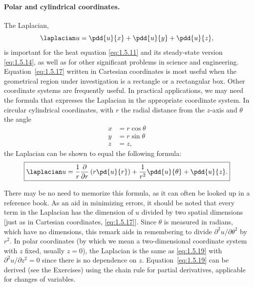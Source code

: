 \paragraph{Polar and cylindrical coordinates.}
The Laplacian,
\begin{equation}
\laplacian u = \pdd{u}{x} + \pdd{u}{y} + \pdd{u}{z},
\label{eq:1.5.17}
\end{equation}
is important for the heat equation \eqref{eq:1.5.11} and its steady-state version \eqref{eq:1.5.14}, as well as for other significant problems in science and engineering. Equation~\eqref{eq:1.5.17} written in Cartesian coordinates is most useful when the geometrical region under investigation is a rectangle or a rectangular box. Other coordinate systems are frequently useful. In practical applications, we may need the formula that expresses the Laplacian in the appropriate coordinate system. In circular cylindrical coordinates, with $r$ the radial distance from the $z$-axis and $\theta$ the angle
\begin{equation}
\boxed{\begin{aligned}
x &= r\cos\theta \\
y &= r\sin\theta \\
z &= z,
\end{aligned}}
\label{eq:1.5.18}
\end{equation}
the Laplacian can be shown to equal the following formula:
\begin{equation}
\boxed{\laplacian u = \frac{1}{r}\frac{\partial}{\partial r}\left(r\pd{u}{r}\right) + \frac{1}{r^2}\pdd{u}{\theta} + \pdd{u}{z}.}
\label{eq:1.5.19}
\end{equation}

There may be no need to memorize this formula, as it can often be looked up in a reference book. As an aid in minimizing errors, it should be noted that every term in the Laplacian has the dimension of $u$ divided by two spatial dimensions [just as in Cartesian coordinates, \eqref{eq:1.5.17}]. Since $\theta$ is measured in radians, which have no dimensions, this remark aids in remembering to divide $\partial^2 u/\partial\theta^2$ by $r^2$. In polar coordinates (by which we mean a two-dimensional coordinate system with $z$ fixed, usually $z = 0$), the Laplacian is the same as \eqref{eq:1.5.19} with $\partial^2 u/\partial z^2 = 0$ since there is no dependence on $z$. Equation~\eqref{eq:1.5.19} can be derived (see the Exercises) using the chain rule for partial derivatives, applicable for changes of variables.

